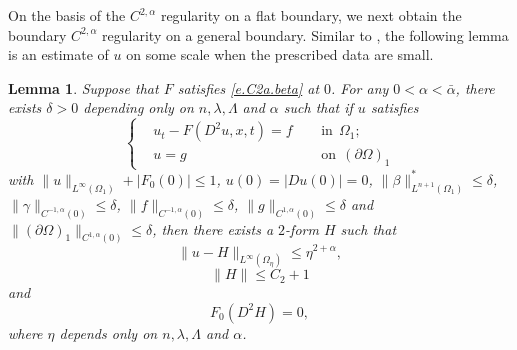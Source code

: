 \documentclass[preprint,12pt]{elsarticle}
\newtheorem{lemma}[theorem]{Lemma}
\theoremstyle{definition}
\theoremstyle{remark}
\numberwithin{equation}{section}
\begin{document}
On the basis of the $C^{2,\alpha}$ regularity on a flat boundary, we next obtain the boundary $C^{2,\alpha}$ regularity on a general boundary. Similar to , the following lemma is an estimate of $u$ on some scale when the prescribed data are small.

\begin{lemma}\label{L-C2a.K1}
Suppose that $F$ satisfies \cref{e.C2a.beta} at $0$. For any $0<\alpha<\bar{\alpha}$, there exists $\delta>0$ depending only on $n,\lambda,\Lambda$ and $\alpha$ such that if $u$ satisfies
\begin{equation*}
\left\{\begin{aligned}
&u_t-F(D^2u,x,t)=f&& ~~\mbox{in}~~\Omega_1;\\
&u=g&& ~~\mbox{on}~~(\partial \Omega)_1
\end{aligned}\right.
\end{equation*}
with $\|u\|_{L^{\infty}(\Omega_1)}+|F_0(0)|\leq 1$, $u(0)=|Du(0)|=0$, $\|\beta\|^*_{L^{n+1}(\Omega_1)}\leq \delta$, $\|\gamma\|_{C^{-1,\alpha}(0)}\leq \delta$, $\|f\|_{C^{-1,\alpha}(0)}\leq \delta$, $\|g\|_{C^{1,\alpha}(0)}\leq \delta$ and $\|(\partial \Omega)_1\|_{C^{1,\alpha}(0)} \leq \delta$, then there exists a $2$-form $H$ such that
\begin{equation*}
  \|u-H\|_{L^{\infty}(\Omega_{\eta})}\leq \eta^{2+\alpha},
\end{equation*}
\begin{equation*}
\|H\|\leq C_2+1
\end{equation*}
and
\begin{equation*}
F_0(D^2  H)=0,
\end{equation*}
where $\eta$ depends only on $n,\lambda,\Lambda$ and $\alpha$.
\end{lemma}
\end{document}
